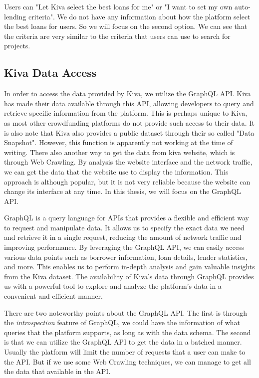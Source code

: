Users can "Let Kiva select the best loans for me" or "I want to set my own auto-lending criteria".
We do not have any information about how the platform select the best loans for users.
So we will focus on the second option.
We can see that the criteria are very similar to the criteria that users can use to search for projects.

\subsection{Kiva Data Access}

In order to access the data provided by Kiva, we utilize the GraphQL API.
Kiva has made their data available through this API, allowing developers to query and retrieve specific information from the platform.
This is perhaps unique to Kiva, as most other crowdfunding platforms do not provide such access to their data.
It is also note that Kiva also provides a public dataset through their so called "Data Snapshot".
However, this function is apparently not working at the time of writing.
There also another way to get the data from kiva website, which is through Web Crawling.
By analysis the website interface and the network traffic, we can get the data that the website use to display the information.
This approach is although popular, but it is not very reliable because the website can change its interface at any time.
In this thesis, we will focus on the GraphQL API.

GraphQL is a query language for APIs that provides a flexible and efficient way to request and manipulate data.
It allows us to specify the exact data we need and retrieve it in a single request, reducing the amount of network traffic and improving performance.
By leveraging the GraphQL API, we can easily access various data points such as borrower information, loan details, lender statistics, and more.
This enables us to perform in-depth analysis and gain valuable insights from the Kiva dataset.
The availability of Kiva's data through GraphQL provides us with a powerful tool to explore and analyze the platform's data in a convenient and efficient manner.

There are two noteworthy points about the GraphQL API.
The first is through the \textit{introspection} \parencite{graphql-introspection} feature of GraphQL,
we could have the information of what queries that the platform supports,
as long as with the data schema.
The second is that we can utilize the GraphQL API to get the data in a batched manner.
Usually the platform will limit the number of requests that a user can make to the API.
But if we use some Web Crawling techniques, we can manage to get all the data that available in the API.


